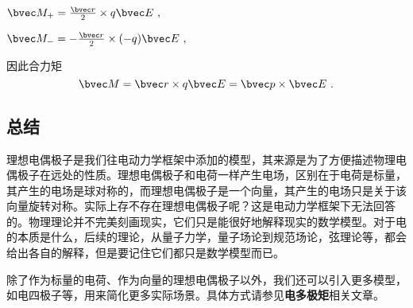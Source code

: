 $\bvec M_+= \frac{\bvec r}{2} \times q\bvec E~,$

$\bvec M_-= - \frac{\bvec r}{2} \times (-q)\bvec E~,$

因此合力矩 
\begin{equation}
\bvec M = \bvec r \times q \bvec E = \bvec p \times \bvec E~.
\end{equation}

\subsection{总结}

理想电偶极子是我们往电动力学框架中添加的模型，其来源是为了方便描述物理电偶极子在远处的性质。理想电偶极子和电荷一样产生电场，区别在于电荷是标量，其产生的电场是球对称的，而理想电偶极子是一个向量，其产生的电场只是关于该向量旋转对称。实际上存不存在理想电偶极子呢？这是电动力学框架下无法回答的。物理理论并不完美刻画现实，它们只是能很好地解释现实的数学模型。对于电的本质是什么，后续的理论，从量子力学，量子场论到规范场论，弦理论等，都会给出各自的解释，但是要记住它们都只是数学模型而已。

除了作为标量的电荷、作为向量的理想电偶极子以外，我们还可以引入更多模型，如电四极子等，用来简化更多实际场景。具体方式请参见\textbf{电多极矩}相关文章。

